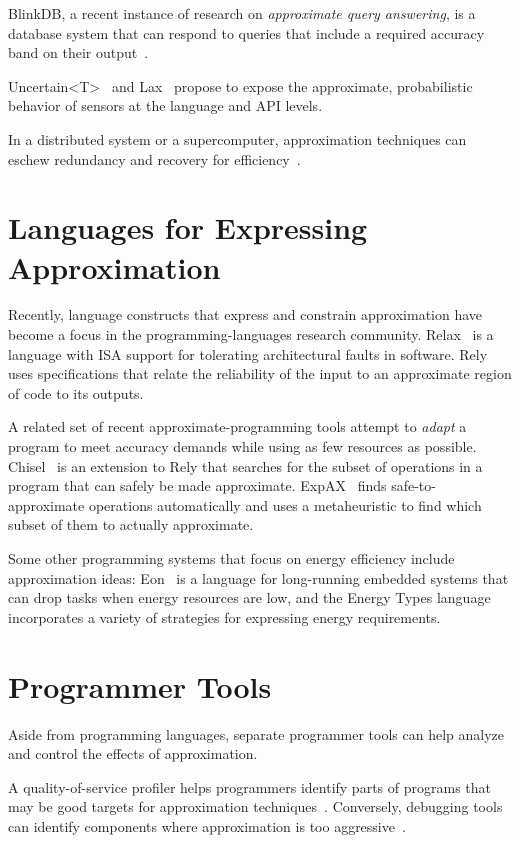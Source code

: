 BlinkDB,
a recent instance of research on \emph{approximate query answering},
is a database system that can respond to queries that include a required
accuracy band on their output~\cite{blinkdb}.

Uncertain{\textless}T{\textgreater}~\cite{uncertaint} and Lax~\cite{lax}
propose to expose the approximate, probabilistic behavior of sensors at the
language and API levels.

In a distributed system or a supercomputer, approximation techniques can
eschew redundancy and recovery for efficiency~\cite{dekruijf-icpp}.


\section{Languages for Expressing Approximation}

Recently, language constructs that express and constrain
approximation have become a focus in the programming-languages research
community.
Relax~\cite{relax} is a language with ISA support for tolerating architectural
faults in software.
Rely~\cite{rely} uses specifications that relate the reliability of the input
to an approximate region of code to its outputs.

A related set of recent approximate-programming tools attempt to \emph{adapt}
a program to meet accuracy demands while using as few resources as possible.
Chisel~\cite{chisel} is an extension to Rely that searches for the subset of
operations in a program that can safely be made approximate.
ExpAX~\cite{expax-tr} finds safe-to-approximate operations automatically and
uses a metaheuristic to find which subset of them to actually approximate.

Some other programming systems that focus on energy efficiency include
approximation ideas:
Eon~\cite{eon} is a language for long-running embedded systems that can drop
tasks when energy resources are low,
and the Energy Types language~\cite{energytypes} incorporates a variety of
strategies for expressing energy requirements.


\section{Programmer Tools}

Aside from programming languages, separate programmer tools can help analyze
and control the effects of approximation.

A quality-of-service profiler helps programmers identify parts of programs
that may be good targets for approximation techniques~\cite{qosprof}.
Conversely, debugging tools can identify components where approximation is too
aggressive~\cite{approxdebug}.

